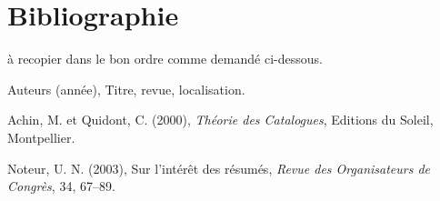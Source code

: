 \documentclass[12pt]{article}
\begin{document}
\section*{Bibliographie}
{}

à recopier dans le bon ordre comme demandé ci-dessous.

\noindent [1] Auteurs (année), Titre, revue, localisation.

\noindent [2] Achin, M. et Quidont, C. (2000), {\it Théorie des
Catalogues}, Editions du Soleil, Montpellier.

\noindent [3] Noteur, U. N. (2003), Sur l'intér\^et des
résumés, {\it Revue des Organisateurs de Congrès}, 34, 67--89.
\end{document}
